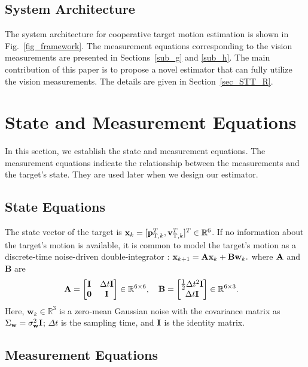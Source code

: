 \documentclass[letterpaper, 10 pt, conference]{ieeeconf}  %
\begin{document}
\subsection{System Architecture}

The system architecture for cooperative target motion estimation is shown in Fig.~\ref{fig_framework}.
The measurement equations corresponding to the vision measurements are presented in Sections~\ref{sub_g} and \ref{sub_h}.
The main contribution of this paper is to propose a novel estimator that can fully utilize the vision measurements. The details are given in Section~\ref{sec_STT_R}.

\section{State and Measurement Equations}

In this section, we establish the state and measurement equations.
The measurement equations indicate the relationship between the measurements and the target's state. They are used later when we design our estimator.

\subsection{State Equations}
The state vector of the target is $\mathbf{x}_k =[\mathbf{p}_{{\rm T}, k}^T,\mathbf{v}_{{\rm T}, k}^T]^T\in\mathbb{R}^6$. If no information about the target's motion is available, it is common to model the target's motion as a discrete-time noise-driven double-integrator \cite{li2022three, ning2023comparison}:
 $\mathbf{x}_{k+1} = \mathbf{A}\mathbf{x}_{k} +\mathbf{B}\mathbf{w}_{k}.$
where $\mathbf{A}$ and $\mathbf{B}$ are
\begin{align}
\mathbf{A}
&=\begin{bmatrix}
\mathbf{I} & \Delta t\mathbf{I} \\
\mathbf{0}&\mathbf{I}
\end{bmatrix}\in\mathbb{R}^{6\times6},
\quad \mathbf{B}
=\begin{bmatrix}
\frac{1}{2}\Delta t^2\mathbf{I}\\
\Delta t \mathbf{I}
\end{bmatrix}\in\mathbb{R}^{6\times 3}. 
\end{align}
Here, $\mathbf{w}_k\in\mathbb{R}^3$ is a zero-mean Gaussian noise with the covariance matrix as $\Sigma_{\mathbf{w}} = \sigma_{\mathbf{w}}^2\mathbf{I}$; $\Delta t$ is the sampling time, and $\mathbf{I}$ is the identity matrix.

\subsection{Measurement Equations}
\end{document}

